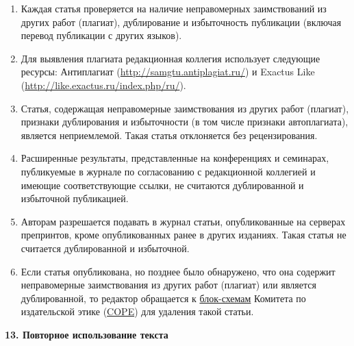 \begin{enumerate}

\item[1.]  Каждая статья проверяется на наличие неправомерных заимствований из других работ (плагиат), дублирование и избыточность публикации (включая перевод публикации с других языков).

\item[2.]  

Для выявления плагиата редакционная коллегия использует следующие ресурсы: Антиплагиат (\url{http://samgtu.antiplagiat.ru/}) и Exactus Like (\url{http://like.exactus.ru/index.php/ru/}).

\item[3.]  

Статья, содержащая неправомерные заимствования из других работ (плагиат),  признаки дублирования и избыточности (в том числе признаки автоплагиата), является неприемлемой. Такая статья отклоняется без рецензирования.

\item[4.]  

Расширенные результаты, представленные на конференциях и семинарах, публикуемые в журнале по согласованию с редакционной коллегией и имеющие соответствующие ссылки, не считаются дублированной и избыточной публикацией.

\item[5.]  

Авторам разрешается подавать в журнал статьи, опубликованные на серверах препринтов, кроме опубликованных ранее в других изданиях. Такая статья не считается дублированной и избыточной.

\item[6.]  

Если статья опубликована, но позднее было обнаружено, что она содержит неправомерные заимствования из других работ (плагиат) или является дублированной, то редактор обращается к \href{http://publicationethics.org/resources/flowcharts}{блок-схемам} Комитета по издательской этике (\href{http://publicationethics.org/}{COPE}) для удаления такой статьи.

\end{enumerate}



\noindent

{\bf 13. Повторное использование текста}



